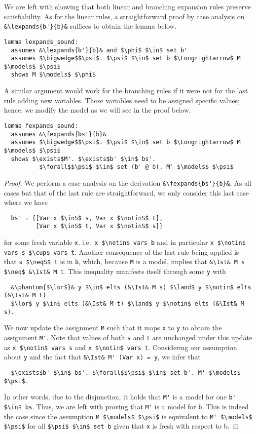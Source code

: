 \documentclass[sigplan,10pt,anonymous,review]{acmart}
\newcommand{\lefttrianglebar}{\mathrel{\tikz[baseline]{\draw (1ex, 0.75ex) -- (0, 1.25ex) -- (0, 0.25ex) -- cycle; \draw (0, 0.75ex) -- (1ex, 0.75ex);}}}
\newcommand{\lefttriangle}{\mathrel{\tikz[baseline]{\draw (1ex, 0.75ex) -- (0, 1.25ex) -- (0, 0.25ex) -- cycle;}}}
\newcommand{\lexpands}[2]{#1 $\lefttriangle$ #2}
\newcommand{\fexpands}[2]{#1 $\lefttrianglebar$ #2}
\newcommand{\inS}{\in_\text{s}}
\newcommand{\notinS}{\notin_\text{s}}
\newcommand{\neqS}{\neq_\text{s}}
\newcommand{\Ist}{I$_\text{st}$}
\begin{document}
\noindent We are left with showing that both linear and branching expansion rules preserve satisfiability.
As for the linear rules, a straightforward proof by case analysis on \lstinline!&\lexpands{b'}{b}&! suffices to obtain the lemma below.
\begin{lstlisting}
lemma lexpands_sound:
  assumes &\lexpands{b'}{b}& and $\phi$ $\in$ set b'
  assumes $\bigwedge$$\psi$. $\psi$ $\in$ set b $\Longrightarrow$ M $\models$ $\psi$
  shows M $\models$ $\phi$
\end{lstlisting}
A similar argument would work for the branching rules if it were not for the last rule adding new variables.
Those variables need to be assigned specific values; hence, we modify the model as we will see in the proof below.
\begin{lstlisting}[belowskip=0pt]
lemma fexpands_sound:
  assumes &\fexpands{bs'}{b}&
  assumes $\bigwedge$$\psi$. $\psi$ $\in$ set b $\Longrightarrow$ M $\models$ $\psi$
  shows $\exists$M'. $\exists$b' $\in$ bs'.
          $\forall$$\psi$ $\in$ set (b' @ b). M' $\models$ $\psi$
\end{lstlisting}
\begin{proof}
  We perform a case analysis on the derivation \lstinline!&\fexpands{bs'}{b}&!.
  As all cases but that of the last rule are straightforward, we only consider this last case where we have 
\begin{lstlisting}
  bs' = {[Var x $\inS$ s, Var x $\notinS$ t],
         [Var x $\inS$ t, Var x $\notinS$ s]}
\end{lstlisting}
  for some fresh variable \lstinline!x!, i.e.\ \lstinline!x $\notin$ vars b! and in particular \lstinline!x $\notin$ vars s $\cup$ vars t!.
  Another consequence of the last rule being applied is that \lstinline!s $\neqS$ t! is in \lstinline!b!, which, because \lstinline!M! is a model, implies that \lstinline!&\Ist& M s $\neq$ &\Ist& M t!.
  This inequality manifests itself through some \lstinline!y! with
\begin{lstlisting}
  &\phantom{$\lor$}& y $\in$ elts (&\Ist& M s) $\land$ y $\notin$ elts (&\Ist& M t)
  $\lor$ y $\in$ elts (&\Ist& M t) $\land$ y $\notin$ elts (&\Ist& M s).
\end{lstlisting}
  We now update the assignment \lstinline!M! such that it maps \lstinline!x! to \lstinline!y! to obtain the assignment \lstinline!M'!.
  Note that values of both \lstinline!s! and \lstinline!t! are unchanged under this update as \lstinline!x $\notin$ vars s! and \lstinline!x $\notin$ vars t!.
  Considering our assumption about \lstinline!y! and the fact that \lstinline!&\Ist& M' (Var x) = y!, we infer that
\begin{lstlisting}
  $\exists$b' $\in$ bs'. $\forall$$\psi$ $\in$ set b'. M' $\models$ $\psi$.
\end{lstlisting}
  In other words, due to the disjunction, it holds that \lstinline!M'! is a model for one \lstinline!b' $\in$ bs!.
  Thus, we are left with proving that \lstinline!M'! is a model for \lstinline!b!.
  This is indeed the case since the assumption \lstinline!M $\models$ $\psi$! is equivalent to \lstinline!M' $\models$ $\psi$! for all \lstinline!$\psi$ $\in$ set b! given that \lstinline!x! is fresh with respect to b.
\end{proof}
\end{document}
